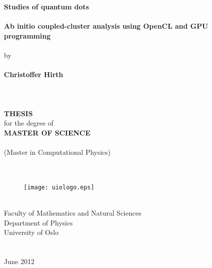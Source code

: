\begin{titlepage}
\begin{center}
{\huge \bf Studies of quantum dots}\\
\ \\
{\Large \bf Ab initio coupled-cluster analysis using OpenCL and GPU programming}\\ 
\ \\ 
{\Large by}\\
\ \\
{\Large \bf Christoffer Hirth}\\
\ \\
\ \\
\ \\
{\large \bf THESIS}\\
{\large for the degree of}\\
{\large \bf MASTER OF SCIENCE}\\
\ \\
(Master in Computational Physics)\\
\ \\
\ \\
\begin{figure}[h!]
\begin{center}
\texttt{[image: uiologo.eps]}
\end{center}
\end{figure}
\ \\
\Large{\rm Faculty of Mathematics and Natural Sciences}\\
{\rm Department of Physics}\\
{\rm University of Oslo}\\
\ \\
\ \\
{\rm June 2012}
\end{center}
\end{titlepage}
